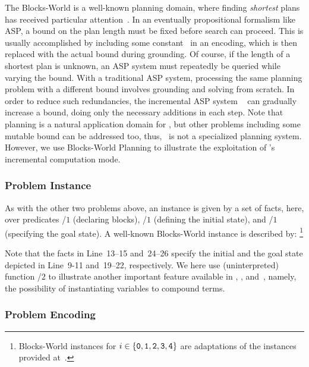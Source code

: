 The Blocks-World is a well-known planning domain,
where finding \emph{shortest} plans has received particular attention~\cite{gupnau92a}.
In an eventually propositional formalism like ASP,
a bound on the plan length must be fixed before search can proceed.
This is usually accomplished by including some constant~
in an encoding, which is then replaced with the actual bound during grounding.
Of course, if the length of a shortest plan is unknown,
an ASP system must repeatedly be queried while varying the bound.
With a traditional ASP system, processing
the same planning problem with a different bound
involves grounding and solving from scratch.
In order to reduce such redundancies,
the incremental ASP system \iclingo~\cite{gekakaosscth08a}
can gradually increase a bound, %
doing only the necessary additions in each step.
Note that planning is a natural application domain for \iclingo,
but other problems including some mutable bound can be addressed too, thus,
\iclingo\ is not a specialized planning system.
However, we use Blocks-World Planning to illustrate the exploitation of
\iclingo's incremental computation mode.


\subsubsection{Problem Instance}\label{subsec:block:instance}

As with the other two problems above,
an instance is given by a set of facts, here,
over predicates /$1$ (declaring blocks),
/$1$ (defining the initial state), and
/$1$ (specifying the goal state).
A well-known Blocks-World instance is described by:%
\footnote{%
  Blocks-World instances  for $i\in\{\texttt{0},\texttt{1},\texttt{2},\texttt{3},\texttt{4}\}$
  are adaptations of the instances provided at~\cite{erdemBW}.}
%

%
Note that the facts in Line~13--15 and~24--26 specify the initial
and the goal state depicted in Line~9-11 and~19--22, respectively.
We here use (uninterpreted) function /$2$ to illustrate another
important feature available in \gringo, \clingo, and~\iclingo, namely,
the possibility of instantiating variables to compound terms.


\subsubsection{Problem Encoding}\label{subsec:block:encoding}


